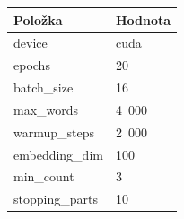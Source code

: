 \begin{tabular}{ll}
\toprule
Položka & Hodnota\\
\midrule
device & cuda\\
epochs & 20\\
batch\_size & 16\\
max\_words & 4 000\\
warmup\_steps & 2 000\\
embedding\_dim & 100\\
min\_count & 3\\
stopping\_parts & 10\\
\bottomrule
\end{tabular}
